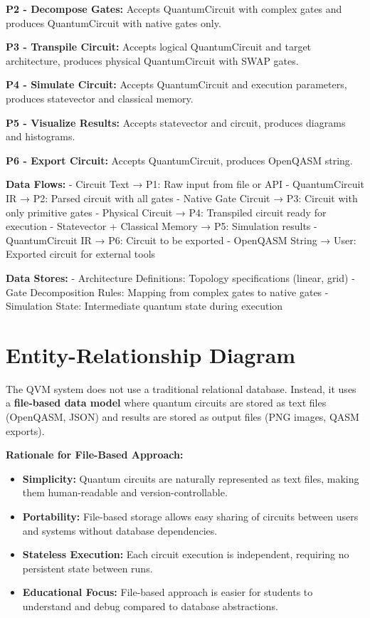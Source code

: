 \textbf{P2 - Decompose Gates:} Accepts QuantumCircuit with complex gates and produces QuantumCircuit with native gates only.

\textbf{P3 - Transpile Circuit:} Accepts logical QuantumCircuit and target architecture, produces physical QuantumCircuit with SWAP gates.

\textbf{P4 - Simulate Circuit:} Accepts QuantumCircuit and execution parameters, produces statevector and classical memory.

\textbf{P5 - Visualize Results:} Accepts statevector and circuit, produces diagrams and histograms.

\textbf{P6 - Export Circuit:} Accepts QuantumCircuit, produces OpenQASM string.

\textbf{Data Flows:}
- Circuit Text → P1: Raw input from file or API
- QuantumCircuit IR → P2: Parsed circuit with all gates
- Native Gate Circuit → P3: Circuit with only primitive gates
- Physical Circuit → P4: Transpiled circuit ready for execution
- Statevector + Classical Memory → P5: Simulation results
- QuantumCircuit IR → P6: Circuit to be exported
- OpenQASM String → User: Exported circuit for external tools

\textbf{Data Stores:}
- Architecture Definitions: Topology specifications (linear, grid)
- Gate Decomposition Rules: Mapping from complex gates to native gates
- Simulation State: Intermediate quantum state during execution

\section{Entity-Relationship Diagram}
The QVM system does not use a traditional relational database. Instead, it uses a \textbf{file-based data model} where quantum circuits are stored as text files (OpenQASM, JSON) and results are stored as output files (PNG images, QASM exports).

\textbf{Rationale for File-Based Approach:}
\begin{itemize}
\item \textbf{Simplicity:} Quantum circuits are naturally represented as text files, making them human-readable and version-controllable.
\item \textbf{Portability:} File-based storage allows easy sharing of circuits between users and systems without database dependencies.
\item \textbf{Stateless Execution:} Each circuit execution is independent, requiring no persistent state between runs.
\item \textbf{Educational Focus:} File-based approach is easier for students to understand and debug compared to database abstractions.
\end{itemize}

